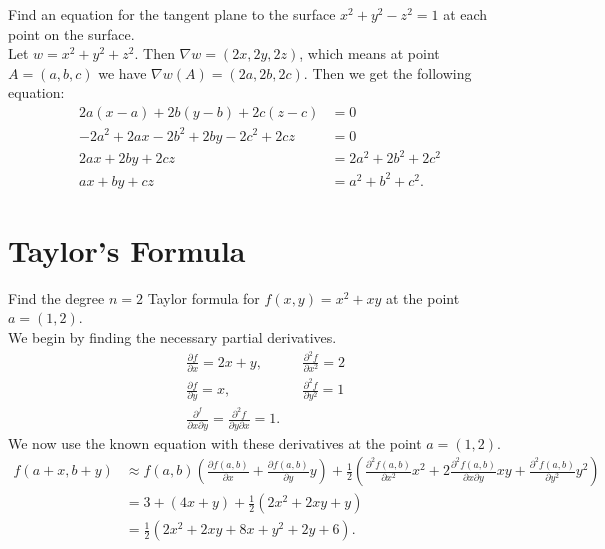 \documentclass[12pt]{book}
\newenvironment{exercise}[2][Exercise]{\begin{trivlist}
\item[\hskip \labelsep {\bfseries #1}\hskip \labelsep {\bfseries #2.}]}{\end{trivlist}}
\begin{document}
\begin{exercise}{9.4.13}
    Find an equation for the tangent plane to the surface $x^2 + y^2 -z^2 = 1$ at each point on the surface.  \\
    
    Let $w = x^2 + y^2 + z^2 $. Then $\nabla w = \left( 2x, 2y, 2z \right)$, which means at point $A = (a,b,c)$ we have $\nabla w(A) = \left( 2a, 2b, 2c \right)$. Then we get the following equation:
    \begin{align*}
    2 a (x -a ) + 2b (y-b) + 2c (z -c ) &= 0\\
    -2 a^2 + 2 ax - 2b^2 + 2 by - 2c^2 + 2 cz &= 0  \\
    2 ax + 2 by + 2cz &= 2 a^2 + 2 b^2 + 2c^2 \\
    ax + by + cz &= a^2 + b^2 + c^2 .
    \end{align*} 
\end{exercise}




\section{Taylor's Formula}


\begin{exercise}{9.5.1}
    Find the degree $n =2$ Taylor formula for $f(x,y)=x^2 + x y$ at the point $a=(1,2)$.  \\
    
    We begin by finding the necessary partial derivatives.
    \begin{align*}
        &\frac{\partial f}{\partial x} = 2x+y, &&\frac{\partial^2 f}{\partial x^2} = 2 \\
        &\frac{\partial f}{\partial y} = x,    &&\frac{\partial^2 f}{\partial y^2} = 1 \\
        &\frac{\partial^f}{\partial x \partial y} = \frac{\partial^2 f}{\partial y \partial x} = 1.
    \end{align*}
    We now use the known equation with these derivatives at the point $a=(1,2)$.
    \begin{align*}
        f(a+x, b+y) &\approx f(a,b) \left( \frac{\partial f(a,b)}{\partial x} + \frac{\partial f(a,b)}{\partial y} y \right) + \frac{1}{2} \left( \frac{\partial^2 f(a,b)}{\partial x^2} x^2 + 2 \frac{\partial^2 f(a,b)}{\partial x \partial y} x y + \frac{\partial^2 f(a,b)}{\partial y^2} y^2 \right)  \\
                    &= 3 + \left(4x+y\right) + \frac{1}{2} \left( 2 x^2 + 2 xy + y \right)  \\
                    &= \frac{1}{2} \left( 2x^2 + 2xy+ 8x+y^2 + 2 y + 6\right).
    \end{align*}
\end{exercise}
\end{document}
